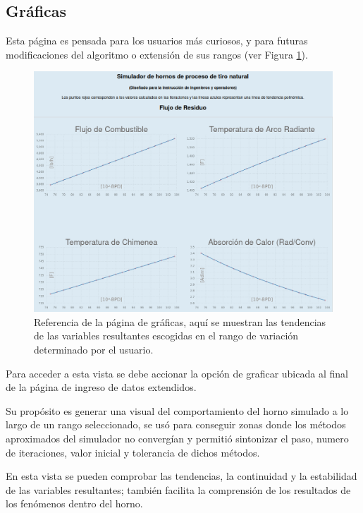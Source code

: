 \subsection{Gráficas}
\par Esta página es pensada para los usuarios más curiosos, y para futuras modificaciones del algoritmo o extensión de sus rangos (ver Figura \ref{fig:graficas}).
\begin{figure}[H]\begin{center}
\includegraphics[scale=0.36]{images/graficas.png}
\caption[Página de gráficas]{Referencia de la página de gráficas, aquí se muestran las tendencias de las variables resultantes escogidas en el rango de variación determinado por el usuario.}
\label{fig:graficas} \end{center} \end{figure}
\par Para acceder a esta vista se debe accionar la opción de graficar ubicada al final de la página de ingreso de datos extendidos.
\par Su propósito es generar una visual del comportamiento del horno simulado a lo largo de un rango seleccionado, se usó para conseguir zonas donde los métodos aproximados del simulador no convergían y permitió sintonizar el paso, numero de iteraciones, valor inicial y tolerancia de dichos métodos.
\par En esta vista se pueden comprobar las tendencias, la continuidad y la estabilidad de las variables resultantes; también facilita la comprensión de los resultados de los fenómenos dentro del horno.

